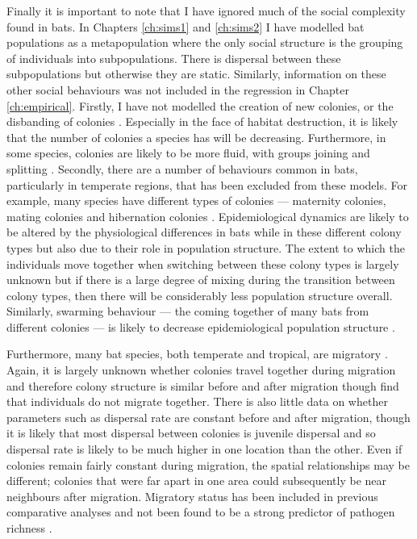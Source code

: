 Finally it is important to note that I have ignored much of the social complexity found in bats.
In Chapters \ref{ch:sims1} and \ref{ch:sims2} I have modelled bat populations as a metapopulation where the only social structure is the grouping of individuals into subpopulations.
There is dispersal between these subpopulations but otherwise they are static.
Similarly, information on these other social behaviours was not included in the regression in Chapter \ref{ch:empirical}.
Firstly, I have not modelled the creation of new colonies, or the disbanding of colonies \cite{metheny2008genetic}.
Especially in the face of habitat destruction, it is likely that the number of colonies a species has will be decreasing.
Furthermore, in some species, colonies are likely to be more fluid, with groups joining and splitting \cite{kerth2012causes, august2014sympatric}.
Secondly, there are a number of behaviours common in bats, particularly in temperate regions, that has been excluded from these models.
For example, many species have different types of colonies --- maternity colonies, mating colonies and hibernation colonies \cite{kerth2008causes}.
Epidemiological dynamics are likely to be altered by the physiological differences in bats while in these different colony types \cite{george2011host, langwig2015host, blehert2012fungal} but also due to their role in population structure.
The extent to which the individuals move together when switching between these colony types is largely unknown \cite{kurta2002philopatry} but if there is a large degree of mixing during the transition between colony types, then there will be considerably less population structure overall.
Similarly, swarming behaviour --- the coming together of many bats from different colonies --- is likely to decrease epidemiological population structure \cite{kerth2012causes}.


Furthermore, many bat species, both temperate and tropical, are migratory \cite{fleming2003ecology, krauel2013recent, popa2009bats, hutterer2005bat}.
Again, it is largely unknown whether colonies travel together during migration and therefore colony structure is similar before and after migration \cite{carter2013cooperation} though \textcite{kurta2002philopatry} find that individuals do not migrate together.
There is also little data on whether parameters such as dispersal rate are constant before and after migration, though it is likely that most dispersal between colonies is juvenile dispersal and so dispersal rate is likely to be much higher in one location than the other.
Even if colonies remain fairly constant during migration, the spatial relationships may be different; colonies that were far apart in one area could subsequently be near neighbours after migration.
Migratory status has been included in previous comparative analyses and not been found to be a strong predictor of pathogen richness \cite{turmelle2009correlates, maganga2014bat}. 

